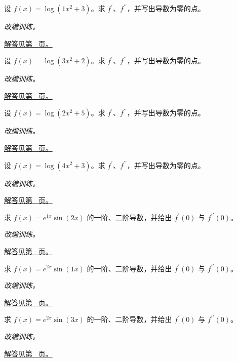 \documentclass[12pt,fontset=fandol]{ctexart}
\begin{document}
\begin{example}[对数复合与二阶导数]\label{ex:c8q15}
设 $f(x)=\log(1x^2+3)$。求 $f^{\prime}$、$f^{\prime\prime}$，并写出导数为零的点。
\par\textit{改编训练。}\par\hyperref[ans:c8q15]{解答见第~\pageref{ans:c8q15} 页。}
\end{example}
\begin{example}[对数复合与二阶导数]\label{ex:c8q16}
设 $f(x)=\log(3x^2+2)$。求 $f^{\prime}$、$f^{\prime\prime}$，并写出导数为零的点。
\par\textit{改编训练。}\par\hyperref[ans:c8q16]{解答见第~\pageref{ans:c8q16} 页。}
\end{example}
\begin{example}[对数复合与二阶导数]\label{ex:c8q17}
设 $f(x)=\log(2x^2+5)$。求 $f^{\prime}$、$f^{\prime\prime}$，并写出导数为零的点。
\par\textit{改编训练。}\par\hyperref[ans:c8q17]{解答见第~\pageref{ans:c8q17} 页。}
\end{example}
\begin{example}[对数复合与二阶导数]\label{ex:c8q18}
设 $f(x)=\log(4x^2+3)$。求 $f^{\prime}$、$f^{\prime\prime}$，并写出导数为零的点。
\par\textit{改编训练。}\par\hyperref[ans:c8q18]{解答见第~\pageref{ans:c8q18} 页。}
\end{example}
\begin{example}[指数与三角函数的复合求导]\label{ex:c8q19}
求 $f(x)=e^{1x}\sin(2x)$ 的一阶、二阶导数，并给出 $f^{\prime}(0)$ 与 $f^{\prime\prime}(0)$。
\par\textit{改编训练。}\par\hyperref[ans:c8q19]{解答见第~\pageref{ans:c8q19} 页。}
\end{example}
\begin{example}[指数与三角函数的复合求导]\label{ex:c8q20}
求 $f(x)=e^{2x}\sin(1x)$ 的一阶、二阶导数，并给出 $f^{\prime}(0)$ 与 $f^{\prime\prime}(0)$。
\par\textit{改编训练。}\par\hyperref[ans:c8q20]{解答见第~\pageref{ans:c8q20} 页。}
\end{example}
\begin{example}[指数与三角函数的复合求导]\label{ex:c8q21}
求 $f(x)=e^{2x}\sin(3x)$ 的一阶、二阶导数，并给出 $f^{\prime}(0)$ 与 $f^{\prime\prime}(0)$。
\par\textit{改编训练。}\par\hyperref[ans:c8q21]{解答见第~\pageref{ans:c8q21} 页。}
\end{example}
\end{document}
